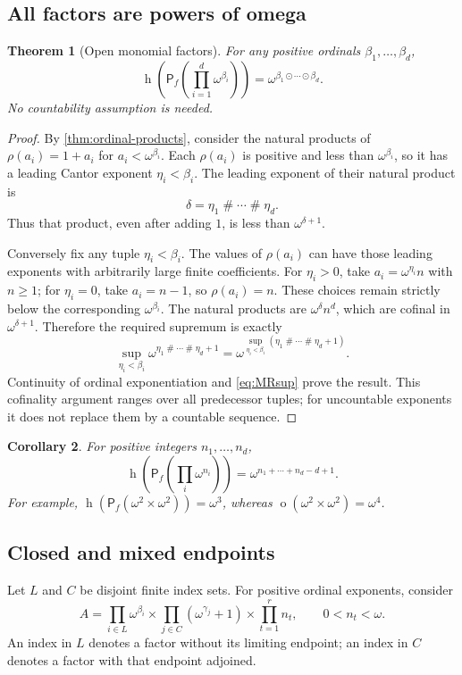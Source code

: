 \documentclass[11pt,letterpaper]{article}
\theoremstyle{teal}
\newtheorem{theorem}{Theorem}[section]
\newtheorem{corollary}[theorem]{Corollary}
\theoremstyle{definition}
\newcommand{\Pf}{\mathsf P_{\!f}}
\newcommand{\hgt}{\operatorname{h}}
\newcommand{\mot}{\operatorname{o}}
\newcommand{\nsum}{\mathbin{\#}}
\newcommand{\MR}{\mathbin{\odot}}
\begin{document}
\subsection{All factors are powers of omega}
\begin{theorem}[Open monomial factors]\label{thm:monomials}
For any positive ordinals $\beta_1,\ldots,\beta_d$,
\begin{equation}\label{eq:monomial-height}
 \boxed{\displaystyle
 \hgt\!\left(\Pf\!\left(\prod_{i=1}^d\omega^{\beta_i}\right)\right)
 =\omega^{\beta_1\MR\cdots\MR\beta_d}.}
\end{equation}
No countability assumption is needed.
\end{theorem}
\begin{proof}
By \cref{thm:ordinal-products}, consider the natural products of $\rho(a_i)=1+a_i$ for $a_i<\omega^{\beta_i}$. Each $\rho(a_i)$ is positive and less than $\omega^{\beta_i}$, so it has a leading Cantor exponent $\eta_i<\beta_i$. The leading exponent of their natural product is
\[
 \delta=\eta_1\nsum\cdots\nsum\eta_d.
\]
Thus that product, even after adding $1$, is less than $\omega^{\delta+1}$.

Conversely fix any tuple $\eta_i<\beta_i$. The values of $\rho(a_i)$ can have those leading exponents with arbitrarily large finite coefficients. For $\eta_i>0$, take $a_i=\omega^{\eta_i}n$ with $n\geq1$; for $\eta_i=0$, take $a_i=n-1$, so $\rho(a_i)=n$. These choices remain strictly below the corresponding $\omega^{\beta_i}$. The natural products are $\omega^\delta n^d$, which are cofinal in $\omega^{\delta+1}$. Therefore the required supremum is exactly
\[
 \sup_{\eta_i<\beta_i}\omega^{\eta_1\nsum\cdots\nsum\eta_d+1}
 =\omega^{\sup_{\eta_i<\beta_i}(\eta_1\nsum\cdots\nsum\eta_d+1)}.
\]
Continuity of ordinal exponentiation and \eqref{eq:MRsup} prove the result. This cofinality argument ranges over all predecessor tuples; for uncountable exponents it does not replace them by a countable sequence.
\end{proof}

\begin{corollary}\label{cor:finite-exponents}
For positive integers $n_1,\ldots,n_d$,
\[
 \hgt\!\left(\Pf\!\left(\prod_i\omega^{n_i}\right)\right)
 =\omega^{n_1+\cdots+n_d-d+1}.
\]
For example, $\hgt(\Pf(\omega^2\times\omega^2))=\omega^3$, whereas $\mot(\omega^2\times\omega^2)=\omega^4$.
\end{corollary}

\subsection{Closed and mixed endpoints}
Let $L$ and $C$ be disjoint finite index sets. For positive ordinal exponents, consider
\[
 A=\prod_{i\in L}\omega^{\beta_i}
   \times\prod_{j\in C}(\omega^{\gamma_j}+1)
   \times\prod_{t=1}^r n_t,
 \qquad 0<n_t<\omega.
\]
An index in $L$ denotes a factor without its limiting endpoint; an index in $C$ denotes a factor with that endpoint adjoined.
\end{document}
